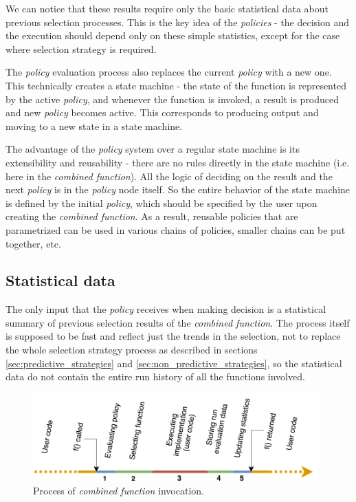We can notice that these results require only the basic statistical data about previous selection processes. This is the key idea of the \textit{policies} - the decision and the execution should depend only on these simple statistics, except for the case where selection strategy is required.

The \textit{policy} evaluation process also replaces the current \textit{policy} with a new one. This technically creates a state machine - the state of the function is represented by the active \textit{policy}, and whenever the function is invoked, a result is produced and new \textit{policy} becomes active. This corresponds to producing output and moving to a new state in a state machine.

The advantage of the \textit{policy} system over a regular state machine is its extensibility and reusability - there are no rules directly in the state machine (i.e. here in the \textit{combined function}). All the logic of deciding on the result and the next \textit{policy} is in the \textit{policy} node itself. So the entire behavior of the state machine is defined by the initial \textit{policy}, which should be specified by the user upon creating the \textit{combined function}. As a result, reusable policies that are parametrized can be used in various chains of policies, smaller chains can be put together, etc.

\subsection{Statistical data}
\label{subsec:statistical_data}

The only input that the \textit{policy} receives when making decision is a statistical summary of previous selection results of the \textit{combined function}. The process itself is supposed to be fast and reflect just the trends in the selection, not to replace the whole selection strategy process as described in sections \ref{sec:predictive_strategies} and \ref{sec:non_predictive_strategies}, so the statistical data do not contain the entire run history of all the functions involved.

\begin{figure}[h!]
	\captionsetup{justification=centering,margin=0.5cm}
	\centerline{\mbox{\includegraphics[width=110mm]{./img/run_schema.png}}}
	\caption{Process of \textit{combined function} invocation.}
	\label{fig:run_schema}
\end{figure}

